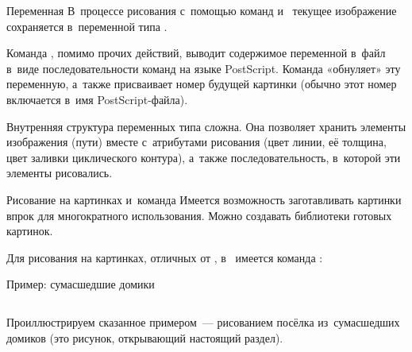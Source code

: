 	{}

\begin{frame}{Переменная }
В~процессе рисования с~помощью команд  и~ текущее
изображение сохраняется в~переменной  типа
.

Команда , помимо прочих действий, выводит содержимое переменной
 в~файл в~виде последовательности команд на языке
PostScript. Команда  «обнуляет» эту переменную, а~также
присваивает номер будущей картинки (обычно этот номер включается в~имя
PostScript-файла).

Внутренняя структура переменных типа  сложна. Она позволяет
хранить элементы изображения (пути) вместе с~атрибутами рисования (цвет линии,
её толщина, цвет заливки циклического контура), а~также последовательность,
в~которой эти элементы рисовались.
\end{frame}

\begin{frame}{Рисование на картинках и~команда }
Имеется возможность заготавливать картинки впрок для многократного
использования. Можно создавать библиотеки готовых картинок.

Для рисования на картинках, отличных от ,
в~ имеется команда :
\begin{center}
%
%
%
\end{center}
\end{frame}

\begin{frame}{Пример: сумасшедшие домики}
\begin{columns}
Проиллюстрируем сказанное примером~— рисованием посёлка из~сумасшедших домиков
(это рисунок, открывающий настоящий раздел).

\centerline{}
\end{columns}
\end{frame}

